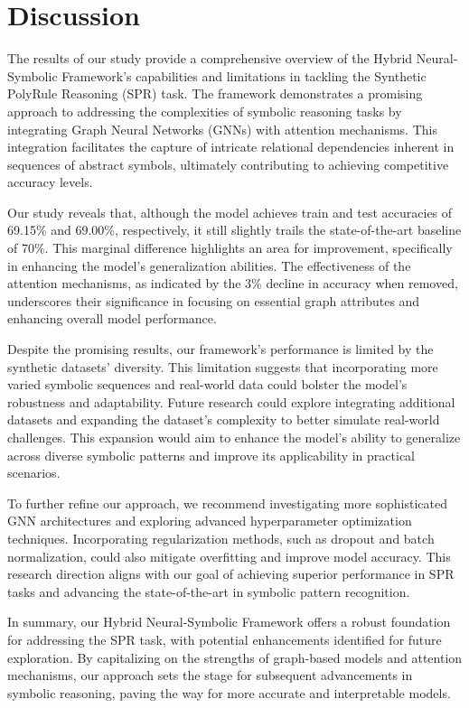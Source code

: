 \documentclass{article}
\begin{document}
\section{Discussion}
The results of our study provide a comprehensive overview of the Hybrid Neural-Symbolic Framework's capabilities and limitations in tackling the Synthetic PolyRule Reasoning (SPR) task. The framework demonstrates a promising approach to addressing the complexities of symbolic reasoning tasks by integrating Graph Neural Networks (GNNs) with attention mechanisms. This integration facilitates the capture of intricate relational dependencies inherent in sequences of abstract symbols, ultimately contributing to achieving competitive accuracy levels.

Our study reveals that, although the model achieves train and test accuracies of 69.15\% and 69.00\%, respectively, it still slightly trails the state-of-the-art baseline of 70\%. This marginal difference highlights an area for improvement, specifically in enhancing the model's generalization abilities. The effectiveness of the attention mechanisms, as indicated by the 3\% decline in accuracy when removed, underscores their significance in focusing on essential graph attributes and enhancing overall model performance.

Despite the promising results, our framework's performance is limited by the synthetic datasets' diversity. This limitation suggests that incorporating more varied symbolic sequences and real-world data could bolster the model's robustness and adaptability. Future research could explore integrating additional datasets and expanding the dataset's complexity to better simulate real-world challenges. This expansion would aim to enhance the model's ability to generalize across diverse symbolic patterns and improve its applicability in practical scenarios.

To further refine our approach, we recommend investigating more sophisticated GNN architectures and exploring advanced hyperparameter optimization techniques. Incorporating regularization methods, such as dropout and batch normalization, could also mitigate overfitting and improve model accuracy. This research direction aligns with our goal of achieving superior performance in SPR tasks and advancing the state-of-the-art in symbolic pattern recognition.

In summary, our Hybrid Neural-Symbolic Framework offers a robust foundation for addressing the SPR task, with potential enhancements identified for future exploration. By capitalizing on the strengths of graph-based models and attention mechanisms, our approach sets the stage for subsequent advancements in symbolic reasoning, paving the way for more accurate and interpretable models.
\end{document}
